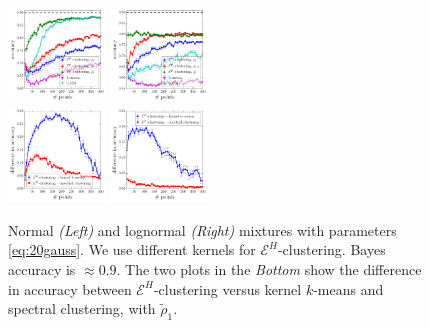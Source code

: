 \documentclass{article}
\begin{document}
\begin{figure}[t]
\includegraphics[width=0.23\textwidth]{normal_kernels.pdf}
\includegraphics[width=0.23\textwidth]{lognormal_kernels.pdf}\\
\includegraphics[width=0.23\textwidth]{normal_kernels_difference.pdf}
\includegraphics[width=0.23\textwidth]{lognormal_kernels_difference.pdf}
\caption{
\label{fig:consist}
Normal \emph{(Left)}
and lognormal \emph{(Right)} mixtures with
parameters \eqref{eq:20gauss}. We use different kernels
for $\mathcal{E}^H$-clustering. Bayes accuracy
is $\approx 0.9$.
The two plots in the \emph{Bottom} show the difference in accuracy
between $\mathcal{E}^H$-clustering versus kernel $k$-means and
spectral clustering, with $\widetilde{\rho}_1$.
}
\end{figure}
\end{document}
